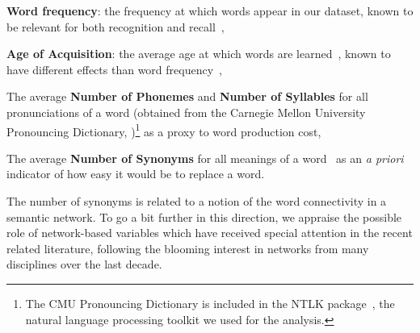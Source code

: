\begin{APAitemize}
    \item \textbf{Word frequency}: the frequency at which words appear in our dataset, known to be relevant for both recognition and recall~\citep{gregg1976word},
    \item \textbf{Age of Acquisition}: the average age at which words are learned~\citep[obtained from][]{Kuperman12}, known to have different effects than word frequency~\citep{morrison1995roles,dewhurst1998separate},
    \item The average \textbf{Number of Phonemes} and \textbf{Number of Syllables} for all pronunciations of a word (obtained from the Carnegie Mellon University Pronouncing Dictionary, \citealp{Weide98})\footnote{The CMU Pronouncing Dictionary is included in the NTLK package~\citep{Bird09}, the natural language processing toolkit we used for the analysis.} as a proxy to word production cost,
    \item The average \textbf{Number of Synonyms} for all meanings of a word~\citep[obtained from][]{WordNet10} as an \emph{a priori} indicator of how easy it would be to replace a word.
\end{APAitemize}


The number of synonyms is related to a notion of the word connectivity in a semantic network.  To go a bit further in this direction, we appraise the possible role of network-based variables which have received special attention in the recent related literature, following the blooming interest in networks from many disciplines over the last decade.

